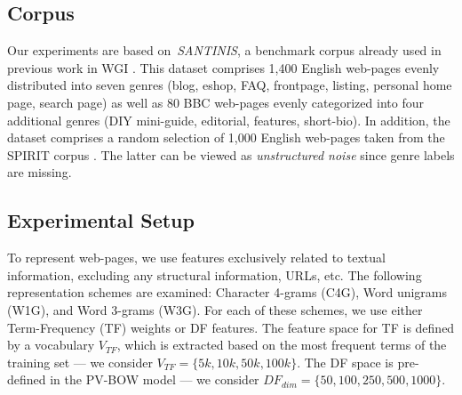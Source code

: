 \documentclass[runningheads]{llncs}
\begin{document}

\subsection{Corpus}\label{sec:corpora}
Our experiments are based on~\textit{SANTINIS}, a benchmark corpus already used in previous work in WGI \cite{mehler2010genres_on_web,pritsos2018open,santini2007automatic}. This dataset comprises 1,400 English web-pages evenly distributed into seven genres (blog, eshop, FAQ, frontpage, listing, personal home page, search page) as well as 80 BBC web-pages evenly categorized into four additional genres (DIY mini-guide, editorial, features, short-bio). In addition, the dataset comprises a random selection of 1,000 English web-pages taken from the SPIRIT corpus \cite{joho2004spirit}. The latter can be viewed as \emph{unstructured noise} since genre labels are missing. 

\subsection{Experimental Setup}\label{sec:evaluation_measures}
To represent web-pages, we use features exclusively related to textual information, excluding any structural information, URLs, etc. The following representation schemes are examined: Character 4-grams (C4G), Word unigrams (W1G), and Word 3-grams (W3G). For each of these schemes, we use either Term-Frequency (TF) weights or DF features. The feature space for TF is defined by a vocabulary $V_{TF}$, which is extracted based on the most frequent terms of the training set --- we consider $V_{TF}=\{5k,10k,50k,100k\}$. The DF space is pre-defined in the PV-BOW model --- we consider $DF_{dim}=\{50,100,250,500,1000\}$.
\end{document}
